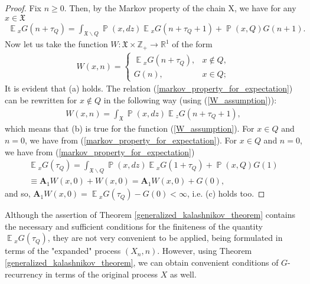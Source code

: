 \documentclass[10pt, reqno]{amsart}
\theoremstyle{definition}
\newcommand{\aasVar}{Q} %
\newcommand{\astVar}{\tau} %
\newcommand{\gtfVar}{G} %
\newcommand{\wtfVar}{W} %
\newcommand{\atoVar}{\mathbf{A}} %
\newcommand{\assVar}{\mathfrak{X}} %
\newcommand{\integers}{\mathbb{Z}} %
\newcommand{\reals}{\mathbb{R}} %
\DeclareMathOperator*{\E}{\mathbb{E}}
\DeclareMathOperator*{\Pb}{\mathbb{P}}
\begin{document}
\begin{proof}
		Fix $n \geq 0$. Then, by the Markov property of the chain X, we have for any $x \in \assVar$
		\begin{gather}
		\E{}_{x}\gtfVar(n + \astVar_{\aasVar}) = \int_{\assVar\backslash\aasVar}\Pb(x, dz)\E{}_{x}\gtfVar(n + \astVar_{\aasVar} + 1) + \Pb(x, \aasVar)\gtfVar(n+1).
		\label{markov_property_for_expectation}
		\end{gather}
		Now let us take the function $\wtfVar : \assVar \times \integers_{+} \xrightarrow{} \reals^{1}$ of the form
		\begin{gather}
		\wtfVar(x, n) = \begin{cases}
		\E{}_{x}\gtfVar(n + \astVar_{\aasVar}), & x \notin Q,\\
		\gtfVar(n), & x \in \aasVar;
		\end{cases}
		\label{W_assumption}
		\end{gather}
		It is evident that (a) holds. The relation (\ref{markov_property_for_expectation}) can be rewritten for $x \notin \aasVar$ in the following way (using (\ref{W_assumption})):
		\begin{gather*}
		\wtfVar(x, n) = \int_{\assVar}\Pb(x, dz)\E{}_{z}\gtfVar(n + \astVar_{\aasVar} + 1),
		\end{gather*}
		which means that (b) is true for the function (\ref{W_assumption}). For $x \in \aasVar$ and $n = 0$, we have from (\ref{markov_property_for_expectation}). For $x \in \aasVar$ and $n = 0$, we have from (\ref{markov_property_for_expectation})
		\begin{gather*}
		\E{}_{x}\gtfVar(\astVar_{\aasVar}) = \int_{\assVar \backslash \aasVar}\Pb(x, dz)\E{}_{x}\gtfVar(1 + \astVar_{\aasVar}) + \Pb(x, \aasVar)\gtfVar(1) \\ \equiv \atoVar_{1}\wtfVar(x, 0) + \wtfVar(x, 0) = \atoVar_{1}\wtfVar(x, 0) + \gtfVar(0),
		\end{gather*}
		and so, $\atoVar_{1}\wtfVar(x, 0) = \E{}_{x}\gtfVar(\astVar_{\aasVar}) - \gtfVar(0) < \infty$, i.e. (c) holds too.
	\end{proof}
	
	Although the assertion of Theorem \ref{generalized_kalashnikov_theorem} contains the necessary and sufficient conditions for the finiteness of the quantity $\E{}_{x}\gtfVar(\astVar_{\aasVar})$, they are not very convenient to be applied, being formulated in terms of the "expanded"$ $ process $(X_{n}, n)$. However, using Theorem \ref{generalized_kalashnikov_theorem}, we can obtain convenient conditions of $\gtfVar$-recurrency in terms of the original process $X$ as well.
	
\end{document}
